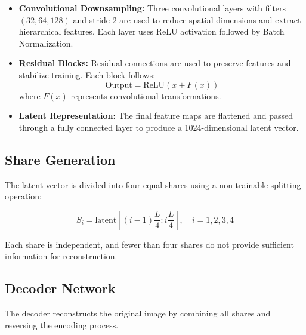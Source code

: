 \begin{itemize}
    \item \textbf{Convolutional Downsampling:} Three convolutional layers with filters \\ $(32, 64, 128)$ and stride 2 are used to reduce spatial dimensions and extract hierarchical features. Each layer uses ReLU activation followed by Batch Normalization.

    \item \textbf{Residual Blocks:} Residual connections are used to preserve features and stabilize training. Each block follows:
    \begin{equation}
\text{Output} = \text{ReLU}(x + F(x))
\end{equation}
    where $F(x)$ represents convolutional transformations.

    \item \textbf{Latent Representation:} The final feature maps are flattened and passed through a fully connected layer to produce a 1024-dimensional latent vector.
\end{itemize}

\subsection{Share Generation}

The latent vector is divided into four equal shares using a non-trainable splitting operation:

\begin{equation}
S_i = \text{latent}\left[(i-1)\frac{L}{4} : i\frac{L}{4}\right], \quad i = 1,2,3,4
\end{equation}

Each share is independent, and fewer than four shares do not provide sufficient information for reconstruction.

\subsection{Decoder Network}

The decoder reconstructs the original image by combining all shares and reversing the encoding process.

